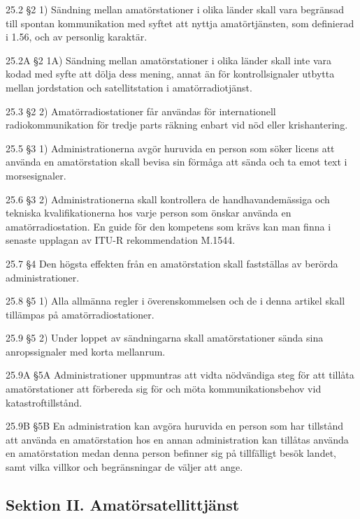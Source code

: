 25.2 \S2 1) Sändning mellan amatörstationer i olika länder skall vara
begränsad till spontan kommunikation med syftet att nyttja amatörtjänsten,
som definierad i 1.56, och av personlig karaktär.
\cite[25.2]{ITU-RR}

25.2A \S2 1A) Sändning mellan amatörstationer i olika länder skall
inte vara kodad med syfte att dölja dess mening, annat än för kontrollsignaler
utbytta mellan jordstation och satellitstation i amatörradiotjänst.
\cite[25.2A]{ITU-RR}

25.3 \S2 2) Amatörradiostationer får användas för internationell
radiokommunikation för tredje parts räkning enbart vid nöd eller
krishantering.
\cite[25.3]{ITU-RR}

25.5 \S3 1) Administrationerna avgör huruvida en person som söker licens
att använda en amatörstation skall bevisa sin förmåga att sända och ta
emot text i morsesignaler.
\cite[25.5]{ITU-RR}

25.6 \S3 2) Administrationerna skall kontrollera de handhavandemässiga och
tekniska kvalifikationerna hos varje person som önskar använda en
amatörradiostation. En guide för den kompetens som krävs kan man finna i
senaste upplagan av ITU-R rekommendation M.1544.
\cite[25.6]{ITU-RR}

25.7 \S4 Den högsta effekten från en amatörstation skall fastställas
av berörda administrationer.
\cite[25.7]{ITU-RR}

25.8 \S5 1) Alla allmänna regler i överenskommelsen och de i denna
artikel skall tillämpas på amatörradiostationer.
\cite[25.8]{ITU-RR}

25.9 \S5 2) Under loppet av sändningarna skall amatörstationer sända
sina anropssignaler med korta mellanrum.
\cite[25.9]{ITU-RR}

25.9A \S5A Administrationer uppmuntras att vidta nödvändiga steg för att
tillåta amatörstationer att förbereda sig för och möta kommunikationsbehov
vid katastroftillstånd.
\cite[25.9A]{ITU-RR}

25.9B \S5B En administration kan avgöra huruvida en person som har tillstånd
att använda en amatörstation hos en annan administration kan tillåtas använda
en amatörstation medan denna person befinner sig på tillfälligt besök landet,
samt vilka villkor och begränsningar de väljer att ange.
\cite[25.9B]{ITU-RR}

\subsection{Sektion II. Amatörsatellittjänst}

